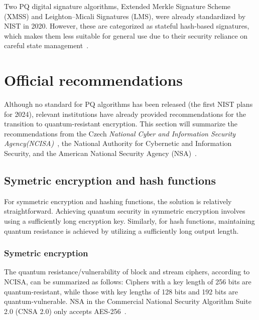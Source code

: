 Two PQ digital signature algorithms, Extended Merkle Signature Scheme (XMSS) and Leighton–Micali Signatures (LMS), were already standardized by NIST in 2020. However, these are categorized as stateful hash-based signatures, which makes them less suitable for general use due to their security reliance on careful state management~\cite{NIST.web.SHBS}.



\section{Official recommendations}
\label{pq.recommendations}

Although no standard for PQ algorithms has been released (the first NIST plans for 2024), relevant institutions have already provided recommendations for the transition to quantum-resistant encryption. This section will summarize the recommendations from the Czech \emph{National Cyber and Information Security Agency(NCISA)}~\cite{NUKIB.min,NUKIB.min.attachment}, the National Authority for Cybernetic and Information Security, and the American National Security Agency (NSA)~\cite{NSA.report,NSA.QaA}.

\subsection{Symetric encryption and hash functions}
\label{subsec:symetric.encryption.and.hash}

For symmetric encryption and hashing functions, the solution is relatively straightforward. Achieving quantum security in symmetric encryption involves using a sufficiently long encryption key. Similarly, for hash functions, maintaining quantum resistance is achieved by utilizing a sufficiently long output length.

\subsubsection{Symetric encryption}

The quantum resistance/vulnerability of block and stream ciphers, according to NCISA, can be summarized as follows: Ciphers with a key length of 256 bits are quantum-resistant, while those with key lengths of 128 bits and 192 bits are quantum-vulnerable. NSA in the Commercial National Security Algorithm Suite 2.0 (CNSA 2.0) only accepts AES-256~\cite{NUKIB.min.attachment}.


